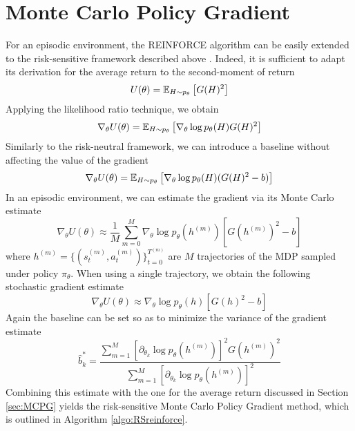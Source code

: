 \section{Monte Carlo Policy Gradient}
For an episodic environment, the REINFORCE algorithm can be easily extended to the risk-sensitive framework described above \cite{tamar2012policy}. Indeed, it is sufficient to adapt its derivation for the average return to the second-moment of return
\begin{equation}
	U(\theta) = \E[H\sim p_\theta]{G(H)^2}
\end{equation}
Applying the likelihood ratio technique, we obtain
\begin{equation}
	\nabla_\theta U(\theta) = \E[H\sim p_\theta]{\nabla_\theta \log p_\theta(H) G(H)^2}
\end{equation}
Similarly to the risk-neutral framework, we can introduce a baseline without affecting the value of the gradient
\begin{equation}
	\nabla_\theta U(\theta) = \E[H\sim p_\theta]{\nabla_\theta \log p_\theta(H) (G(H)^2 - b)}
\end{equation}
In an episodic environment, we can estimate the gradient via its Monte Carlo estimate
\begin{equation}
	\label{eq:reinforce_gradient_2}
	\nabla_\theta U(\theta) \approx \frac{1}{M} \sum_{m = 0}^{M} \nabla_\theta \log p_\theta\left(h^{(m)}\right) \left[G\left(h^{(m)}\right)^2 - b\right]
\end{equation}
where $h^{(m)} = \{(s_t^{(m)}, a_t^{(m)})\}_{t = 0}^{T^{(m)}}$ are $M$ trajectories of the MDP sampled under policy $\pi_\theta$. When using a single trajectory, we obtain the following stochastic gradient estimate 
\begin{equation}
	\nabla_\theta U(\theta) \approx \nabla_\theta \log p_\theta\left(h\right) \left[G\left(h\right)^2 - b\right]
\end{equation}
Again the baseline can be set so as to minimize the variance of the gradient estimate
\begin{equation}
	\label{eq:optimal_baseline_2}
	\widehat{b}_k^* = \frac{\sum^{M}_{m=1} \left[\partial_{\theta_k} \log p_\theta\left(h^{(m)}\right)\right]^2 G(h^{(m)})^2}{\sum^{M}_{m=1} \left[ \partial_{\theta_k} \log p_\theta\left(h^{(m)}\right)\right]^2}
\end{equation}
Combining this estimate with the one for the average return discussed in Section \ref{sec:MCPG} yields the risk-sensitive Monte Carlo Policy Gradient method, which is outlined in Algorithm \ref{algo:RSreinforce}.\\
